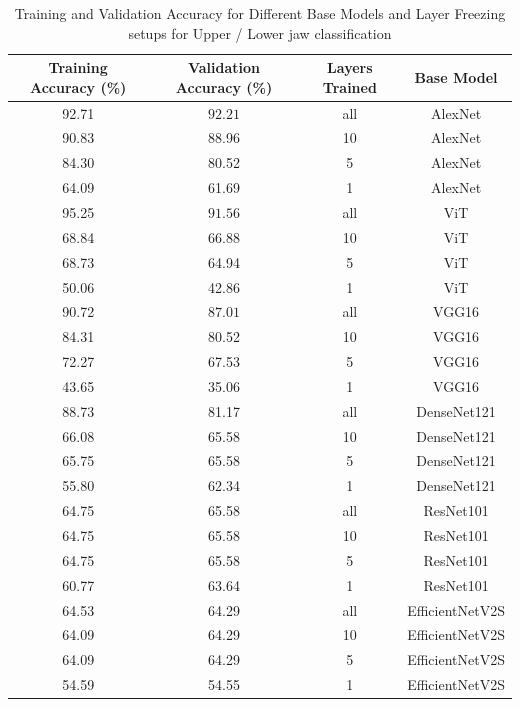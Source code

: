 \documentclass{article}
\begin{document}
\begin{table}[ht]
    \centering
        \begin{tabular}{|c|c|c|c|}
            \hline
            \textbf{Training Accuracy (\%)} & \textbf{Validation Accuracy (\%)} & \textbf{Layers Trained} & \textbf{Base Model} \\ \hline
            92.71 & $\mathbf{92.21}$ & all  & AlexNet \cite{alexnet}       \\\hline
            90.83 & 88.96 & 10   & AlexNet \cite{alexnet}      \\\hline
            84.30 & 80.52 & 5    & AlexNet \cite{alexnet}      \\\hline
            64.09 & 61.69 & 1    & AlexNet \cite{alexnet}      \\\hline
            95.25 & $\mathbf{91.56}$ & all  & ViT  \cite{vit}         \\\hline
            68.84 & 66.88 & 10   & ViT  \cite{vit}         \\\hline
            68.73 & 64.94 & 5    & ViT  \cite{vit}         \\\hline
            50.06 & 42.86 & 1    & ViT  \cite{vit}         \\\hline
            90.72 & $\mathbf{87.01}$ & all  & VGG16     \cite{vgg}    \\\hline
            84.31 & 80.52 & 10   & VGG16   \cite{vgg}      \\\hline
            72.27 & 67.53 & 5    & VGG16   \cite{vgg}      \\\hline
            43.65 & 35.06 & 1    & VGG16   \cite{vgg}      \\\hline
            88.73 & 81.17 & all  & DenseNet121 \cite{densenet}  \\\hline
            66.08 & 65.58 & 10   & DenseNet121 \cite{densenet}  \\\hline
            65.75 & 65.58 & 5    & DenseNet121 \cite{densenet}  \\\hline
            55.80 & 62.34 & 1    & DenseNet121 \cite{densenet}  \\\hline
            64.75 & 65.58 & all  & ResNet101  \cite{resnet}   \\ \hline
            64.75 & 65.58 & 10   & ResNet101   \cite{resnet}  \\\hline
            64.75 & 65.58 & 5    & ResNet101  \cite{resnet}   \\\hline
            60.77 & 63.64 & 1    & ResNet101  \cite{resnet}   \\\hline
            64.53 & 64.29 & all  & EfficientNetV2S  \cite{efficientnetv2} \\\hline
            64.09 & 64.29 & 10   & EfficientNetV2S \cite{efficientnetv2}  \\\hline
            64.09 & 64.29 & 5    & EfficientNetV2S \cite{efficientnetv2}  \\\hline
            54.59 & 54.55 & 1    & EfficientNetV2S \cite{efficientnetv2} \\\hline
        \end{tabular}
    \caption{Training and Validation Accuracy for Different Base Models and Layer Freezing setups for Upper / Lower jaw classification}
    \label{table:results}
\end{table}
\end{document}
